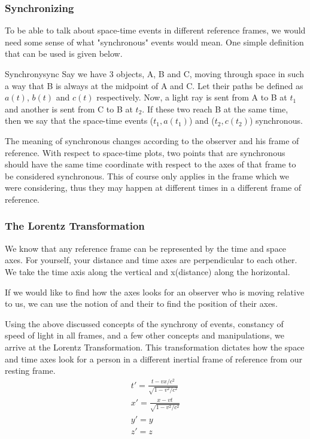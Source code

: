 \documentclass[16pt]{scrartcl}
\numberwithin{equation}{section}
\theoremstyle{plain}
\theoremstyle{definition}
\begin{document}
\subsubsection{Synchronizing}

To be able to talk about space-time events in different reference frames, we would need some sense of what "synchronous" events would mean. One simple definition that can be used is given below.

\begin{defn}{Synchrony}{sync}
    Say we have 3 objects, A, B and C, moving through space in such a way that B is always at the midpoint of A and C. Let their paths be defined as $a(t)$, $b(t)$ and $c(t)$ respectively. Now, a light ray is sent from A to B at $t_1$ and another is sent from C to B at $t_2$. If these two reach B at the same time, then we say that the space-time events ($t_1, a(t_1)$) and ($t_2, c(t_2)$) synchronous.
\end{defn}

The meaning of synchronous changes according to the observer and his frame of reference. With respect to space-time plots, two points that are synchronous should have the same time coordinate with respect to the axes of that frame to be considered synchronous. This of course only applies in the frame which we were considering, thus they may happen at different times in a different frame of reference.

\subsubsection{The Lorentz Transformation}

We know that any reference frame can be represented by the time and space axes. For yourself, your distance and time axes are perpendicular to each other. We take the time axis along the vertical and x(distance) along the horizontal.

If we would like to find how the axes looks for an observer who is moving relative to us, we can use the notion of  and their  to find the position of their axes.

Using the above discussed concepts of the synchrony of events, constancy of speed of light in all frames, and a few other concepts and manipulations, we arrive at the Lorentz Transformation. This transformation dictates how the space and time axes look for a person in a different inertial frame of reference from our resting frame. 
\begin{gather}
    t' = \frac{t-vx/c^2}{\sqrt{1-v^2/c^2}} \\
    x' = \frac{x-vt}{\sqrt{1-v^2/c^2}} \\
    y' = y\\
    z' = z
    \label{eq:lorentz}
\end{gather}
\end{document}
